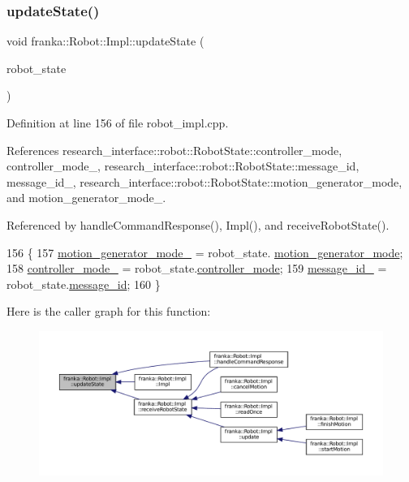 \subsubsection{\texorpdfstring{update\+State()}{updateState()}}
{\footnotesize\ttfamily void franka\+::\+Robot\+::\+Impl\+::update\+State (\begin{DoxyParamCaption}\item[{const \hyperlink{structresearch__interface_1_1robot_1_1RobotState}{research\+\_\+interface\+::robot\+::\+Robot\+State} \&}]{robot\+\_\+state }\end{DoxyParamCaption})\hspace{0.3cm}{\ttfamily [private]}}



Definition at line 156 of file robot\+\_\+impl.\+cpp.



References research\+\_\+interface\+::robot\+::\+Robot\+State\+::controller\+\_\+mode, controller\+\_\+mode\+\_\+, research\+\_\+interface\+::robot\+::\+Robot\+State\+::message\+\_\+id, message\+\_\+id\+\_\+, research\+\_\+interface\+::robot\+::\+Robot\+State\+::motion\+\_\+generator\+\_\+mode, and motion\+\_\+generator\+\_\+mode\+\_\+.



Referenced by handle\+Command\+Response(), Impl(), and receive\+Robot\+State().


\begin{DoxyCode}
156                                                                                 \{
157   \hyperlink{classfranka_1_1Robot_1_1Impl_a209c353b4da1c85d3e633cab161a0d39}{motion\_generator\_mode\_} = robot\_state.
      \hyperlink{structresearch__interface_1_1robot_1_1RobotState_acc1b53a916cd01f1ad39924df4487ec4}{motion\_generator\_mode};
158   \hyperlink{classfranka_1_1Robot_1_1Impl_aa435885c35275fc60b8de90832ae24df}{controller\_mode\_} = robot\_state.\hyperlink{structresearch__interface_1_1robot_1_1RobotState_a1f198a1ead6a28ed3c0481468597eb53}{controller\_mode};
159   \hyperlink{classfranka_1_1Robot_1_1Impl_aed154fce2f3a44a60b7397405974d395}{message\_id\_} = robot\_state.\hyperlink{structresearch__interface_1_1robot_1_1RobotState_a803676123685390b8c4d5a3907d16e7c}{message\_id};
160 \}
\end{DoxyCode}
Here is the caller graph for this function\+:
\nopagebreak
\begin{figure}[H]
\begin{center}
\leavevmode
\includegraphics[width=350pt]{classfranka_1_1Robot_1_1Impl_a79e762e0bc2fe77fdfe7614963883be7_icgraph}
\end{center}
\end{figure}


